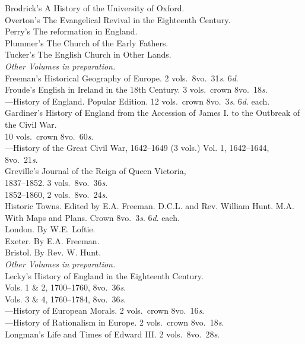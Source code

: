 \documentclass[letterpaper,12pt,oneside,openany]{memoir}
\newcommand{\D}{\hspace*{5mm}}
\newcommand{\E}{\hspace*{2mm}---\hspace*{2mm}}
\begin{document}
\begin{footnotesize}
\D Brodrick's A History of the University of Oxford.\\
\D Overton's The Evangelical Revival in the Eighteenth Century.\\
\D Perry's The reformation in England.\\
\D Plummer's The Church of the Early Fathers.\\
\D Tucker's The English Church in Other Lands.\\
\emph{Other Volumes in preparation.}\\[2mm]
Freeman's Historical Geography of Europe. 2 vols.\ 8vo.\ 31\textit{s}. 6\textit{d}.\\
Froude's English in Ireland in the 18th Century. 3 vols.\ crown 8vo.\ 18\textit{s}.\\
\E History of England. Popular Edition. 12 vols.\ crown 8vo.\ 3\textit{s}. 6\textit{d}. each.\\
Gardiner's History of England from the Accession of James I. to the Outbreak of the Civil War.\\
\D 10 vols.\ crown 8vo.\ 60\textit{s}.\\
\E History of the Great Civil War, 1642--1649 (3 vols.) Vol. 1, 1642--1644, 8vo.\ 21\textit{s}.\\
Greville's Journal of the Reign of Queen Victoria, \\
\D 1837--1852. 3 vols.\ 8vo.\ 36\textit{s}. \\
\D 1852--1860, 2 vols.\ 8vo.\ 24\textit{s}.\\
Historic Towns. Edited by E.A. Freeman. D.C.L. and Rev. William Hunt. M.A.\\
With Maps and Plans. Crown 8vo.\ 3\textit{s}. 6\textit{d}. each.\\
\D London. By W.E. Loftie.\\
\D Exeter. By E.A. Freeman.\\
\D Bristol. By Rev. W. Hunt.\\
\emph{Other Volumes in preparation.}\\[3mm]
Lecky's History of England in the Eighteenth Century. \\
\D Vols. 1 \& 2, 1700--1760, 8vo.\ 36\textit{s}. \\
\D Vols. 3 \& 4, 1760--1784, 8vo.\ 36\textit{s}.\\
\E History of European Morals. 2 vols.\ crown 8vo.\ 16\textit{s}.\\
\E History of Rationalism in Europe. 2 vols.\ crown 8vo.\ 18\textit{s}.\\
Longman's Life and Times of Edward III\@. 2 vols.\ 8vo.\ 28\textit{s}.\\

\end{footnotesize}
\end{document}
